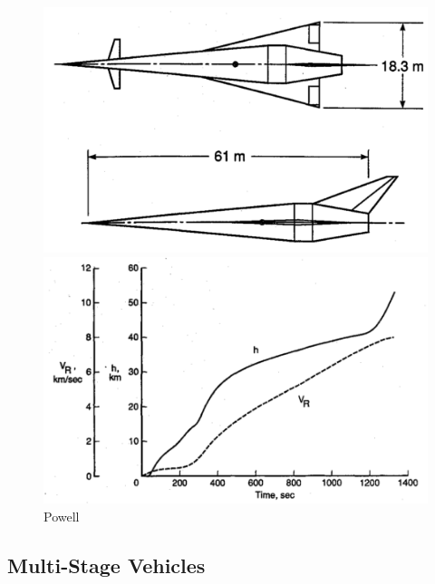 \begin{figure}[h]
	\centering
	\begin{minipage}[b]{0.3\textwidth}
		\centering
		\includegraphics[width=\linewidth]{"figures/2_literature-review/Powell Vehicle"}
		\caption{}
		\label{fig:WilhiteBoosterVehicle}
	\end{minipage}	
	\begin{minipage}[b]{0.6\textwidth}
		\includegraphics[width=\linewidth]{"figures/2_literature-review/Powell Trajectory"}
		\caption{Powell}
		\label{fig:WilHiteBoosterTrajectory}
	\end{minipage}
	
\end{figure}
 
 \subsection{Multi-Stage Vehicles}

